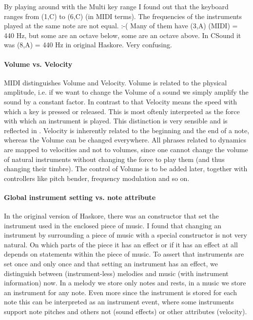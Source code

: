 By playing around with the Multi key range
I found out that the keyboard ranges from (1,C) to (6,C) (in MIDI terms).
The frequencies of the instruments played at the same note are not equal. :-(
Many of them have (3,A) (MIDI) = 440 Hz,
but some are an octave below, some are an octave above.
In CSound it was (8,A) = 440 Hz in original Haskore.
Very confusing.


\paragraph*{Volume vs. Velocity}

MIDI distinguishes Volume and Velocity.
Volume is related to the physical amplitude,
i.e. if we want to change the Volume of a sound
we simply amplify the sound by a constant factor.
In contrast to that Velocity means the speed
with which a key is pressed or released.
This is most oftenly interpreted as the force
with which an instrument is played.
This distinction is very sensible
and is reflected in .
Velocity is inherently related
to the beginning and the end of a note,
whereas the Volume can be changed everywhere.
All phrases related to dynamics are mapped
to velocities and not to volumes,
since one cannot change the volume of natural instruments
without changing the force to play them
(and thus changing their timbre).
The control of Volume is to be added later,
together with controllers like pitch bender, frequency modulation and so on.


\paragraph*{Global instrument setting vs. note attribute}

In the original version of Haskore,
there was an  constructor
that set the instrument used in the enclosed piece of music.
I found that changing an instrument by surrounding a piece of music
with a special constructor is not very natural.
On which parts of the piece it has an effect
or if it has an effect at all
depends on  statements within the piece of music.
To assert that instruments are set once and only once
and that setting an instrument has an effect,
we distinguish between (instrument-less) melodies
and music (with instrument information) now.
In a melody we store only notes and rests,
in a music we store an instrument for any note.
Even more since the instrument is stored for each note
this can be interpreted as an instrument event,
where some instruments support note pitches
and others not (sound effects)
or other attributes (velocity).

